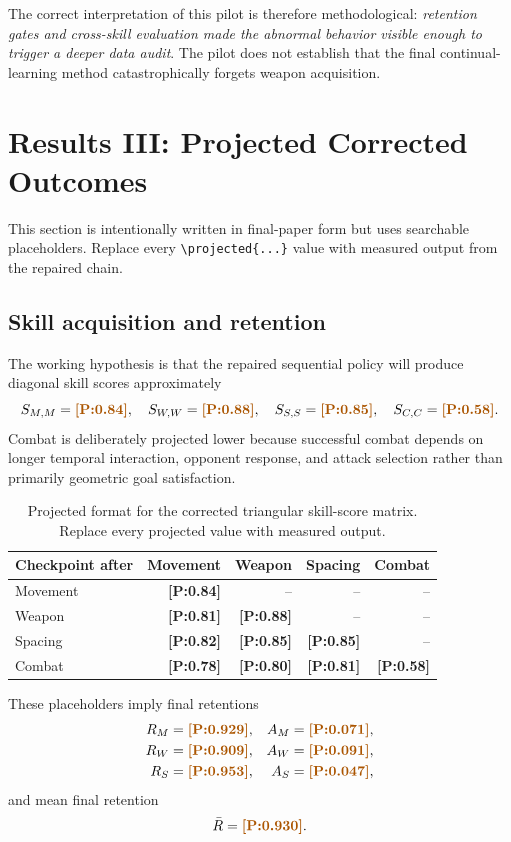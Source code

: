 \documentclass[11pt]{article}
\newcommand{\projected}[1]{\textcolor{Projection}{\textbf{[P:#1]}}}
\begin{document}
The correct interpretation of this pilot is therefore methodological: \emph{retention gates and cross-skill evaluation made the abnormal behavior visible enough to trigger a deeper data audit}. The pilot does not establish that the final continual-learning method catastrophically forgets weapon acquisition.

\section{Results III: Projected Corrected Outcomes}
This section is intentionally written in final-paper form but uses searchable placeholders. Replace every \texttt{\textbackslash projected\{...\}} value with measured output from the repaired chain.

\subsection{Skill acquisition and retention}
The working hypothesis is that the repaired sequential policy will produce diagonal skill scores approximately
\begin{equation}
S_{M,M}=\projected{0.84},\quad
S_{W,W}=\projected{0.88},\quad
S_{S,S}=\projected{0.85},\quad
S_{C,C}=\projected{0.58}.
\end{equation}
Combat is deliberately projected lower because successful combat depends on longer temporal interaction, opponent response, and attack selection rather than primarily geometric goal satisfaction.

\begin{table}[t]
\centering
\caption{Projected format for the corrected triangular skill-score matrix. Replace every projected value with measured output.}
\label{tab:projectedmatrix}
\begin{tabular}{lrrrr}
\toprule
Checkpoint after & Movement & Weapon & Spacing & Combat\\
\midrule
Movement & \projected{0.84} & -- & -- & --\\
Weapon & \projected{0.81} & \projected{0.88} & -- & --\\
Spacing & \projected{0.82} & \projected{0.85} & \projected{0.85} & --\\
Combat & \projected{0.78} & \projected{0.80} & \projected{0.81} & \projected{0.58}\\
\bottomrule
\end{tabular}
\end{table}

These placeholders imply final retentions
\begin{align}
R_M&=\projected{0.929}, & A_M&=\projected{0.071},\\
R_W&=\projected{0.909}, & A_W&=\projected{0.091},\\
R_S&=\projected{0.953}, & A_S&=\projected{0.047},
\end{align}
and mean final retention
\begin{equation}
\bar R=\projected{0.930}.
\end{equation}
\end{document}
